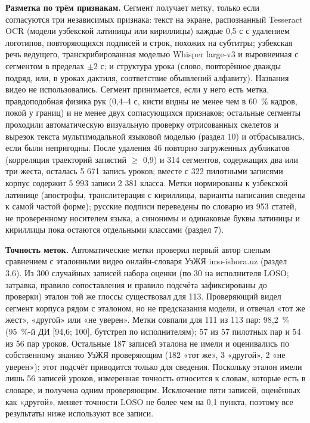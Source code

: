 \documentclass[a4paper,fleqn]{cas-dc}
\begin{document}
\textbf{Разметка по трём признакам.} Сегмент получает метку, только если согласуются три независимых признака: текст на экране, распознанный Tesseract OCR \cite{2007_smith_tesseract} (модели узбекской латиницы или кириллицы) каждые 0,5 с с удалением логотипов, повторяющихся подписей и строк, похожих на субтитры; узбекская речь ведущего, транскрибированная моделью Whisper large-v3 \cite{2023_radford_whisper} и выровненная с сегментом в пределах $\pm$2 с; и структура урока (слово, повторённое дважды подряд, или, в уроках дактиля, соответствие объявлений алфавиту). Названия видео не использовались. Сегмент принимается, если у него есть метка, правдоподобная физика рук (0,4--4 с, кисти видны не менее чем в 60~\% кадров, покой у границ) и не менее двух согласующихся признаков; остальные сегменты проходили автоматическую визуальную проверку отрисованных скелетов и вырезок текста мультимодальной языковой моделью (раздел 10) и отбрасывались, если были непригодны. После удаления 46 повторно загруженных дубликатов (корреляция траекторий запястий $\geq$ 0,9) и 314 сегментов, содержащих два или три жеста, осталась 5 671 запись уроков; вместе с 322 пилотными записями корпус содержит 5 993 записи 2 381 класса. Метки нормированы к узбекской латинице (апострофы, транслитерация с кириллицы, варианты написания сведены к самой частой форме); русские подписи переведены по словарю из 953 статей, не проверенному носителем языка, а синонимы и одинаковые буквы латиницы и кириллицы пока остаются отдельными классами (раздел 7).

\textbf{Точность меток.} Автоматические метки проверил первый автор слепым сравнением с эталонными видео онлайн-словаря УзЖЯ imo-ishora.uz (раздел 3.6). Из 300 случайных записей набора оценки (по 30 на исполнителя LOSO; затравка, правило сопоставления и правило подсчёта зафиксированы до проверки) эталон той же глоссы существовал для 113. Проверяющий видел сегмент корпуса рядом с эталоном, но не предсказания модели, и отвечал «тот же жест», «другой» или «не уверен». Метки совпали для 111 из 113 пар: 98,2~\% (95~\%-й ДИ {[}94,6; 100{]}, бутстреп по исполнителям); 57 из 57 пилотных пар и 54 из 56 пар уроков. Остальные 187 записей эталона не имели и оценивались по собственному знанию УзЖЯ проверяющим (182 «тот же», 3 «другой», 2 «не уверен»); этот подсчёт приводится только для сведения. Поскольку эталон имели лишь 56 записей уроков, измеренная точность относится к словам, которые есть в словаре, и получена одним проверяющим. Исключение пяти записей, оценённых как «другой», меняет точности LOSO не более чем на 0,1 пункта, поэтому все результаты ниже используют все записи.
\end{document}
